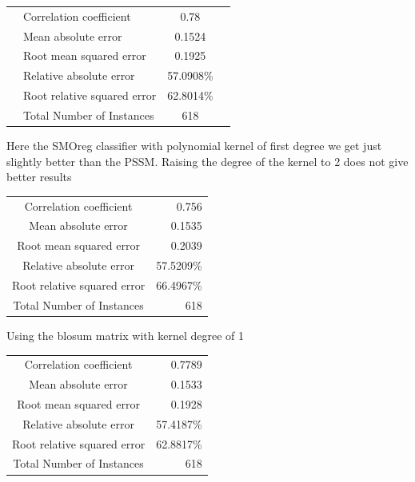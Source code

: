\begin{table}[ht]
\begin{center}
\begin{tabular}{ ll c r }
\hline
 & Correlation coefficient &                 0.78  \\
 & Mean absolute error      &                0.1524 \\
 & Root mean squared error   &               0.1925 \\
 & Relative absolute error    &             57.0908\%  \\
 & Root relative squared error &            62.8014\%  \\
 & Total Number of Instances    &          618 \\
\hline
\end{tabular}
\end{center}
\end{table}


Here the SMOreg classifier with polynomial kernel of first degree we get just slightly better than the PSSM. Raising the degree of the kernel to 2 does not give better results

\begin{table}[ht]
\begin{center}
\begin{tabular}{ c r }
Correlation coefficient &                 0.756 \\
Mean absolute error      &                0.1535 \\
Root mean squared error   &               0.2039 \\
Relative absolute error   &              57.5209\% \\
Root relative squared error &            66.4967\% \\
Total Number of Instances    &          618 \\
\end{tabular}
\end{center}
\end{table}

Using the blosum matrix with kernel degree of 1

\begin{table}[ht]
\begin{center}
\begin{tabular}{ c r }
Correlation coefficient  &                0.7789 \\
Mean absolute error       &               0.1533 \\
Root mean squared error   &               0.1928 \\
Relative absolute error   &              57.4187\% \\
Root relative squared error  &           62.8817\% \\
Total Number of Instances     &         618  \\
\end{tabular}
\end{center}
\end{table}

